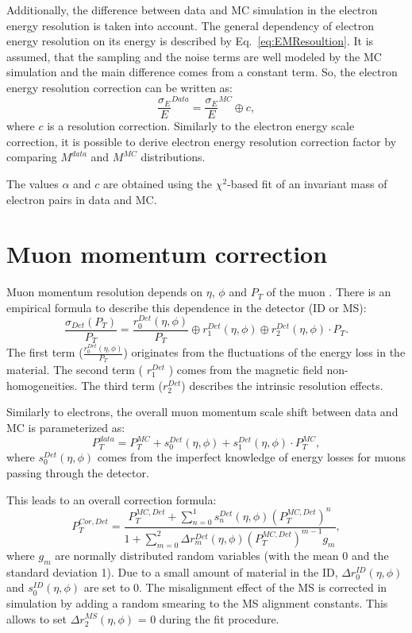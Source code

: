 Additionally, the difference between data and MC simulation in the electron energy resolution is taken into account. The general dependency of electron energy resolution on its energy is described by Eq.~\ref{eq:EMResoultion}. It is assumed, that the sampling and the noise terms are well modeled by the MC simulation and the main difference comes from a constant term. 
So, the electron energy resolution correction can be written as:
\begin{equation}
\frac{\sigma_E}{E}^{Data}=\frac{\sigma_E}{E}^{MC} \oplus c,
\end{equation}
where $c$ is a resolution correction. Similarly to the electron energy scale correction, it is possible to derive electron energy resolution correction factor by comparing $M^{data}$ and $M^{MC}$ distributions. 

The values $\alpha$ and $c$ are obtained using the $\chi^2$-based fit of an invariant mass of electron pairs in data and MC. 

\section{Muon momentum correction}\label{sec:MuonMomCor}
Muon momentum resolution depends on $\eta$, $\phi$ and $P_T$ of the muon \cite{AtlasExperiment}. There is an empirical formula to describe this dependence in the detector (ID or MS)\cite{MuonCalib}:
\begin{equation}\label{eq:MuonResolution}
\frac{\sigma_{Det}(P_T)}{P_T}=\frac{r^{Det}_0(\eta, \phi)}{P_T} \oplus r^{Det}_1 (\eta, \phi)  \oplus r^{Det}_2(\eta, \phi) \cdot P_T.
\end{equation}
The first term ($\frac{r^{Det}_0(\eta, \phi)}{P_T}$) originates from the fluctuations of the energy loss in the material. The second term ( $r^{Det}_1$ ) comes  from the magnetic field non-homogeneities. The third term ($r^{Det}_2$) describes the intrinsic resolution effects. 

Similarly to electrons, the overall muon momentum scale shift between data and MC is parameterized as:
\begin{equation}
P_T^{data}=P_T^{MC}+s_0^{Det}(\eta, \phi)+s_1^{Det}(\eta, \phi) \cdot P_T^{MC},
\end{equation}
where $s_0^{Det}(\eta, \phi)$ comes from the imperfect knowledge of energy losses for muons passing through the detector. 

This leads to an overall correction formula:
\begin{equation}
P^{Cor,Det}_T=\frac{P_{T}^{MC,Det}+\sum\limits_{n=0}^1 s_n^{Det}(\eta, \phi)(P_T^{MC,Det})^n}{1+\sum\limits_{m=0}^2 \Delta r_m^{Det}(\eta, \phi)(P_T^{MC,Det})^{m-1} g_m},
\end{equation}
where $g_m$ are normally distributed random variables (with the mean 0 and the standard deviation 1). Due to a small amount of material in the ID, $\Delta r^{ID}_0(\eta, \phi)$ and $s_0^{ID}(\eta, \phi)$ are set to 0. The misalignment effect of the MS is corrected in simulation by adding a random smearing to the  MS alignment constants. This allows to set $\Delta r^{MS}_2(\eta, \phi)$ = 0 during the fit procedure. 

